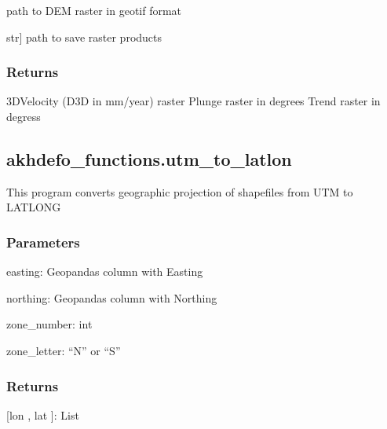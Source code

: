 \documentclass[letterpaper,10pt]{sphinxmanual}
\begin{document}
\begin{fulllineitems}
\begin{description}
\sphinxAtStartPar
path to DEM raster in geotif format

\sphinxlineitem{output\_folder}{[}str{]}
\sphinxAtStartPar
path to save raster products

\end{description}


\subsubsection{Returns}
\label{\detokenize{generated/akhdefo_functions.Akhdefo_inversion:returns}}\begin{description}
\sphinxAtStartPar
3D\sphinxhyphen{}Velocity (D3D in mm/year) raster
Plunge raster in degrees
Trend raster in degress

\end{description}

\end{fulllineitems}


\sphinxstepscope


\subsection{akhdefo\_functions.utm\_to\_latlon}
\label{\detokenize{generated/akhdefo_functions.utm_to_latlon:akhdefo-functions-utm-to-latlon}}\label{\detokenize{generated/akhdefo_functions.utm_to_latlon::doc}}

\begin{fulllineitems}
\label{\detokenize{generated/akhdefo_functions.utm_to_latlon:akhdefo_functions.utm_to_latlon}}
\pysigstartsignatures
{}
\pysigstopsignatures
\sphinxAtStartPar
This program converts geographic projection of shapefiles from UTM to LATLONG


\subsubsection{Parameters}
\label{\detokenize{generated/akhdefo_functions.utm_to_latlon:parameters}}
\sphinxAtStartPar
easting: Geopandas column with Easting

\sphinxAtStartPar
northing: Geopandas column with Northing

\sphinxAtStartPar
zone\_number: int

\sphinxAtStartPar
zone\_letter: “N” or “S”


\subsubsection{Returns}
\label{\detokenize{generated/akhdefo_functions.utm_to_latlon:returns}}
\sphinxAtStartPar
{[}lon , lat {]}: List

\end{fulllineitems}
\end{document}
